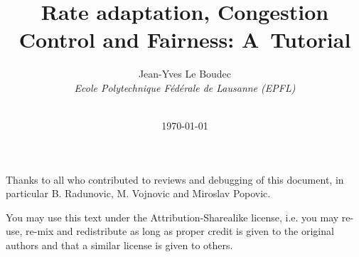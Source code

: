 \documentclass[12pt,twoside,onecolumn,a4paper]{book}
\begin{document}
\graphicspath{{C:/cvs files/exosSourceFiles/exoFigures/}}
\title{
\maketline Rate adaptation, Congestion Control and Fairness: A~Tutorial \maketline }
\author{ {\sc Jean-Yves Le Boudec}  \\ {\em Ecole Polytechnique F\'{e}d\'{e}rale de Lausanne (EPFL)} \\ ~\\
\date{\today}
}\maketitle

\newpage
Thanks to all who contributed to reviews and debugging of this document, in particular B. Radunovic, M. Vojnovic and Miroslav Popovic.

You may use this text under the Attribution-Sharealike license, i.e. you may re-use, re-mix and redistribute as long as proper credit is given to the original authors and that a similar license is given to others.

\tableofcontents


\appendix


\end{document}
